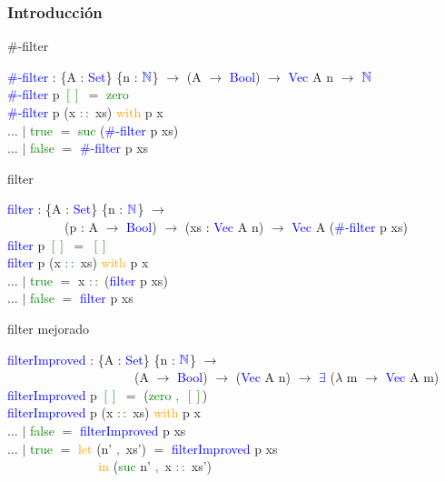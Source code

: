 \documentclass[xcolor=dvipsnames]{beamer} %
\newcommand{\cf}[1]{\textcolor{blue}{#1}}
\newcommand{\ct}[1]{\textcolor{blue}{#1}}
\newcommand{\cc}[1]{\textcolor{green}{#1}}
\newcommand{\ck}[1]{\textcolor{orange}{#1}}
\newcommand{\N}{\ct{\mathbb{N}}}
\newcommand{\ra}{\rightarrow}
\newcommand{\T}{ \ \ \ \ }
\begin{document}
\begin{frame}
\frametitle{Introducci\'on}

\begin{block}{$\#$-filter}

\cf{$\#$-filter} : \{A : \ct{Set}\} \{n : $\N$\} $\ra$ (A $\ra$ \ct{Bool}) $\ra$ \ct{Vec} A n $\ra$ $\N$\\
\cf{$\#$-filter} p \cc{$[]$} $=$ \cc{zero}\\
\cf{$\#$-filter} p (x \cc{$::$} xs) \ck{with} p x\\
$\ldots$ $|$ \cc{true}  $=$ \cc{suc} (\cf{$\#$-filter} p xs)\\
$\ldots$ $|$ \cc{false} $=$ \cf{$\#$-filter} p xs

\end{block}

\pause

\begin{block}{filter}

\cf{filter} : \{A : \ct{Set}\} \{n : $\N$\} $\ra$\\
\ \ \ \ \ \ \ \ \ (p : A $\ra$ \ct{Bool}) $\ra$ (xs : \ct{Vec} A n) $\ra$ \ct{Vec} A (\cf{$\#$-filter} p xs)\\
\cf{filter} p \cc{$[]$} $=$ \cc{$[]$}\\
\cf{filter} p (x \cc{$::$} xs) \ck{with} p x\\
$\ldots$ $|$ \cc{true}  $=$ x \cc{$::$} (\cf{filter} p xs)\\
$\ldots$ $|$ \cc{false} $=$ \cf{filter} p xs

\end{block}

\end{frame}

\begin{frame}

\begin{block}{filter mejorado}

\cf{filterImproved} : \{A : \ct{Set}\} \{n : $\N$\} $\ra$\\
\T \T \T \T \ \ (A $\ra$ \ct{Bool}) $\ra$ (\ct{Vec} A n) $\ra$ \ct{$\exists$} ($\lambda$ m $\ra$ \ct{Vec} A m)\\
\cf{filterImproved} p \cc{$[]$} $=$ (\cc{zero} \cc{$,$} \cc{$[]$})\\
\cf{filterImproved} p (x \cc{$::$} xs) \ck{with} p x\\
$\ldots$ $|$ \cc{false} $=$ \cf{filterImproved} p xs\\
$\ldots$ $|$ \cc{true} $=$ \ck{let} (n' \cc{$,$} xs') $=$ \cf{filterImproved} p xs\\
\T \T \T  \ \ck{in} (\cc{suc} n' \cc{$,$} x \cc{$::$} xs')
\end{block}

\end{frame}
\end{document}
